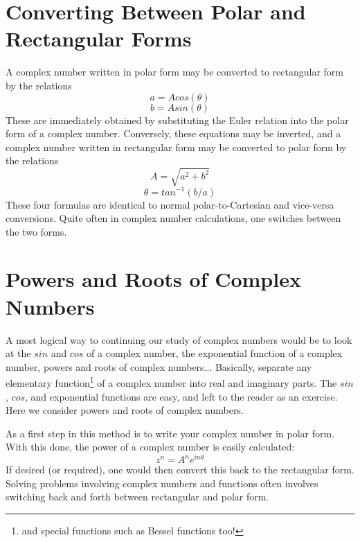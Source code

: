 \section{Converting Between Polar and Rectangular Forms}
A complex number written in polar form may be converted to 
rectangular form by the relations
\begin{equation}
a = A cos(\theta )
\end{equation}
\begin{equation}
b = A sin(\theta )
\end{equation}
These are immediately obtained by substituting the Euler relation
into the polar form of a complex number.
Conversely, these equations may be inverted, and a complex 
number written in rectangular form may be converted to polar 
form by the relations
\begin{equation}
A = \sqrt{a^2 + b^2}
\end{equation}
\begin{equation}
\theta = tan^{-1}(b/a)
\end{equation}
These four formulas are identical to normal polar-to-Cartesian
and vice-versa conversions.  Quite often in complex number
calculations, one switches between the two forms.

\section{Powers and Roots of Complex Numbers}
A most logical way to continuing our study of complex numbers
would be to look at the $sin$ and $cos$ of a complex number,
the exponential function of a complex number, powers and
roots of complex numbers...  Basically, separate any elementary 
function\footnote {and special functions such as Bessel
functions too!} of a complex number into real and imaginary parts.
The $sin$, $cos$, and exponential functions are easy, and
left to the reader as an exercise.  Here we consider powers
and roots of complex numbers.

As a first step in this method is to write your complex number
in polar form.  With this done, the power of a complex number
is easily calculated:
\begin{equation}
z^n = A^n e^{in \theta}
\end{equation}
If desired (or required), one would then convert this
back to the rectangular form.  Solving problems involving
complex numbers and functions often involves switching
back and forth between rectangular and polar form.

